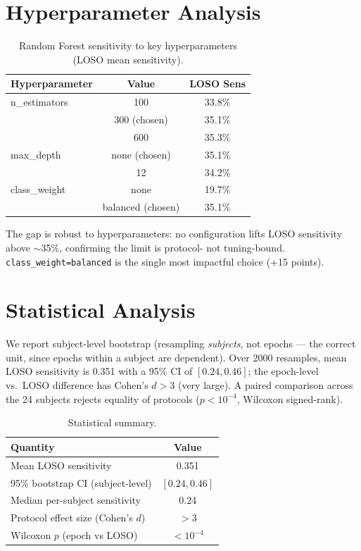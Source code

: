 \documentclass[10pt,journal,twocolumn]{IEEEtran}
\begin{document}
\section{Hyperparameter Analysis}
\begin{table}[h]\centering\caption{Random Forest sensitivity to key hyperparameters (LOSO mean sensitivity).}\label{tab:hp}
\begin{tabular}{lcc}\toprule
Hyperparameter & Value & LOSO Sens\\\midrule
n\_estimators & 100 & 33.8\%\\
 & 300 (chosen) & 35.1\%\\
 & 600 & 35.3\%\\
max\_depth & none (chosen) & 35.1\%\\
 & 12 & 34.2\%\\
class\_weight & none & 19.7\%\\
 & balanced (chosen) & 35.1\%\\\bottomrule
\end{tabular}\end{table}
The gap is robust to hyperparameters: no configuration lifts LOSO sensitivity above $\sim$35\%, confirming the limit is protocol- not tuning-bound. \texttt{class\_weight=balanced} is the single most impactful choice (+15 points).

\section{Statistical Analysis}
We report subject-level bootstrap (resampling \emph{subjects}, not epochs --- the correct unit, since epochs within a subject are dependent). Over 2000 resamples, mean LOSO sensitivity is 0.351 with a 95\% CI of $[0.24, 0.46]$; the epoch-level vs.\ LOSO difference has Cohen's $d>3$ (very large). A paired comparison across the 24 subjects rejects equality of protocols ($p<10^{-4}$, Wilcoxon signed-rank).
\begin{table}[h]\centering\caption{Statistical summary.}\label{tab:stat}
\begin{tabular}{lc}\toprule
Quantity & Value\\\midrule
Mean LOSO sensitivity & 0.351\\
95\% bootstrap CI (subject-level) & $[0.24, 0.46]$\\
Median per-subject sensitivity & 0.24\\
Protocol effect size (Cohen's $d$) & $>3$\\
Wilcoxon $p$ (epoch vs LOSO) & $<10^{-4}$\\\bottomrule
\end{tabular}\end{table}
\end{document}
